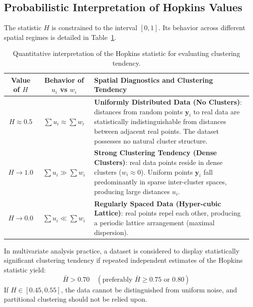\subsection{Probabilistic Interpretation of Hopkins Values}
The statistic $H$ is constrained to the interval $[0, 1]$. Its behavior across different spatial regimes is detailed in Table~\ref{tab:dm-hopkins-interpretation-en}.

\begin{table}[htbp]
\centering
\small
\renewcommand{\arraystretch}{1.25}
\begin{tabularx}{\textwidth}{c c X}
\toprule
\textbf{Value of $H$} & \textbf{Behavior of $u_i$ vs $w_i$} & \textbf{Spatial Diagnostics and Clustering Tendency} \\
\midrule
$H \approx 0.5$ & $\sum u_i \approx \sum w_i$ & \textbf{Uniformly Distributed Data (No Clusters)}: distances from random points $\mathbf{y}_i$ to real data are statistically indistinguishable from distances between adjacent real points. The dataset possesses no natural cluster structure. \\
\addlinespace
$H \to 1.0$ & $\sum u_i \gg \sum w_i$ & \textbf{Strong Clustering Tendency (Dense Clusters)}: real data points reside in dense clusters ($w_i \approx 0$). Uniform points $\mathbf{y}_i$ fall predominantly in sparse inter-cluster spaces, producing large distances $u_i$. \\
\addlinespace
$H \to 0.0$ & $\sum u_i \ll \sum w_i$ & \textbf{Regularly Spaced Data (Hyper-cubic Lattice)}: real points repel each other, producing a periodic lattice arrangement (maximal dispersion). \\
\bottomrule
\end{tabularx}
\caption{Quantitative interpretation of the Hopkins statistic for evaluating clustering tendency.}
\label{tab:dm-hopkins-interpretation-en}
\end{table}

\begin{remark}
In multivariate analysis practice, a dataset is considered to display statistically significant clustering tendency if repeated independent estimates of the Hopkins statistic yield:
\begin{equation}
\label{eq:dm-hopkins-threshold-en}
\bar{H} > 0.70 \quad (\text{preferably } \bar{H} \ge 0.75 \text{ or } 0.80)
\end{equation}
If $H \in [0.45, 0.55]$, the data cannot be distinguished from uniform noise, and partitional clustering should not be relied upon.
\end{remark}

